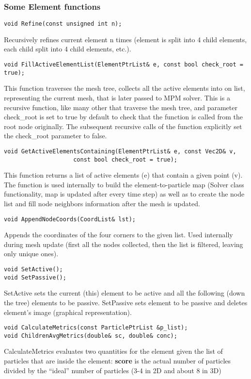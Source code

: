 \subsubsection{Some Element functions}
\begin{lstlisting}
void Refine(const unsigned int n);
\end{lstlisting}
Recursively refines current element n times (element is split into 4 child elements, each child split into 4 child elements, etc.).
\begin{lstlisting}
void FillActiveElementList(ElementPtrList& e, const bool check_root = true);
\end{lstlisting}
This function traverses the mesh tree, collects all the active elements into on list, representing the current
mesh, that is later passed to MPM solver.  This is a recursive function, like many other that traverse the mesh
tree, and parameter check\_root is set to true by default to check that the function is called from the root node
originally. The subsequent recursive calls of the function explicitly set the check\_root parameter to false.
\begin{lstlisting}
void GetActiveElementsContaining(ElementPtrList& e, const Vec2D& v, 
					const bool check_root = true);
\end{lstlisting}
This function returns a list of active elements (e) that contain a given point (v). The function is used internally
to build the element-to-particle map (Solver class functionality, map is updated after every time step) as well as
to create the node list and fill node neighbors information after the mesh is updated.
\begin{lstlisting}
void AppendNodeCoords(CoordList& lst);
\end{lstlisting}
Appends the coordinates of the four corners to the given list. Used internally during mesh update (first all the
nodes collected, then the list is filtered, leaving only unique ones).
\begin{lstlisting}
void SetActive();
void SetPassive();
\end{lstlisting}
SetActive sets the current (this) element to be active and all the following (down the tree) elements to be
passive. SetPassive sets element to be passive and deletes element's image (graphical representation).
\begin{lstlisting}
void CalculateMetrics(const ParticlePtrList &p_list);
void ChildrenAvgMetrics(double& sc, double& conc);
\end{lstlisting}
CalculateMetrics evaluates two quantities for the element given the list of particles that are inside the element: {\bf
score} is the actual number of particles divided by the ``ideal'' number of particles (3-4 in 2D and about 8 in 3D)
